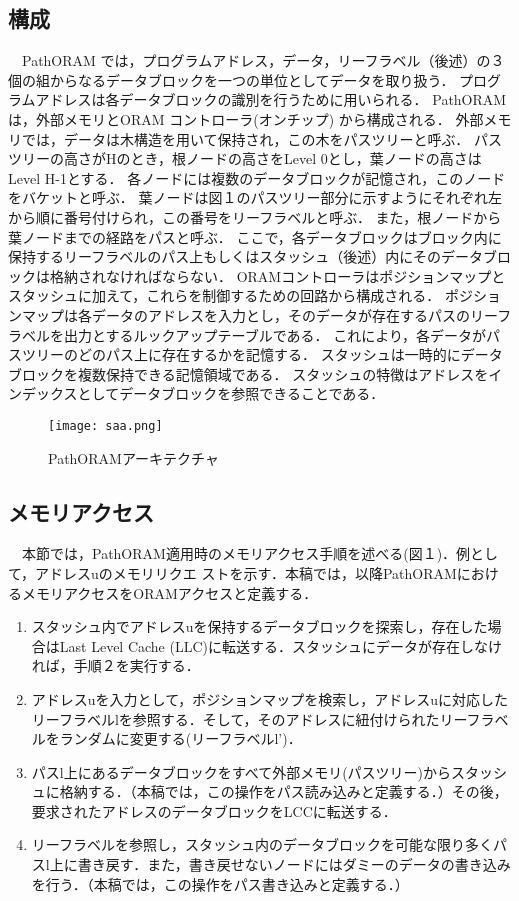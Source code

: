 \documentclass{jarticle}
\begin{document}
\subsection{構成}
　PathORAM では，プログラムアドレス，データ，リーフラベル（後述）の３個の組からなるデータブロックを一つの単位としてデータを取り扱う．
プログラムアドレスは各データブロックの識別を行うために用いられる．
PathORAM は，外部メモリとORAM コントローラ(オンチップ) から構成される．
外部メモリでは，データは木構造を用いて保持され，この木をパスツリーと呼ぶ．
パスツリーの高さがHのとき，根ノードの高さをLevel 0とし，葉ノードの高さはLevel H-1とする．
各ノードには複数のデータブロックが記憶され，このノードをバケットと呼ぶ．
葉ノードは図１のパスツリー部分に示すようにそれぞれ左から順に番号付けられ，この番号をリーフラベルと呼ぶ．
また，根ノードから葉ノードまでの経路をパスと呼ぶ．
ここで，各データブロックはブロック内に保持するリーフラベルのパス上もしくはスタッシュ（後述）内にそのデータブロックは格納されなければならない．
ORAMコントローラはポジションマップとスタッシュに加えて，これらを制御するための回路から構成される．
ポジションマップは各データのアドレスを入力とし，そのデータが存在するパスのリーフラベルを出力とするルックアップテーブルである．
これにより，各データがパスツリーのどのパス上に存在するかを記憶する．
スタッシュは一時的にデータブロックを複数保持できる記憶領域である．
スタッシュの特徴はアドレスをインデックスとしてデータブロックを参照できることである．

\begin{figure}[t]
  \texttt{[image: saa.png]}
  \caption{PathORAMアーキテクチャ}
  \label{tree}
\end{figure}

\subsection{メモリアクセス}
　本節では，PathORAM適用時のメモリアクセス手順を述べる(図１)．例として，アドレスuのメモリリクエ
ストを示す．本稿では，以降PathORAMにおけるメモリアクセスをORAMアクセスと定義する．

\begin{enumerate}
  \item 	スタッシュ内でアドレスuを保持するデータブロックを探索し，存在した場合はLast Level Cache (LLC)に転送する．スタッシュにデータが存在しなければ，手順２を実行する．

  \item 	アドレスuを入力として，ポジションマップを検索し，アドレスuに対応したリーフラベルlを参照する．そして，そのアドレスに紐付けられたリーフラベルをランダムに変更する(リーフラベルl’)．

  \item 	パスl上にあるデータブロックをすべて外部メモリ(パスツリー)からスタッシュに格納する．（本稿では，この操作をパス読み込みと定義する．）その後，要求されたアドレスのデータブロックをLCCに転送する．

  \item 	リーフラベルを参照し，スタッシュ内のデータブロックを可能な限り多くパスl上に書き戻す．また，書き戻せないノードにはダミーのデータの書き込みを行う．（本稿では，この操作をパス書き込みと定義する．）

\end{enumerate}
\end{document}
